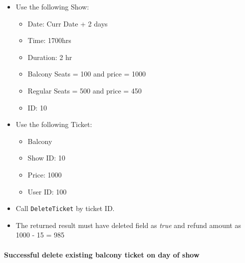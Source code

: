 \documentclass[]{article}
\providecommand{\tightlist}{%
  \setlength{\itemsep}{0pt}\setlength{\parskip}{0pt}}
\let\oldparagraph\paragraph
\renewcommand{\paragraph}[1]{\oldparagraph{#1}\mbox{}}
\begin{document}
\begin{itemize}
\tightlist
\item
  Use the following Show:

  \begin{itemize}
  \tightlist
  \item
    Date: Curr Date + 2 days
  \item
    Time: 1700hrs
  \item
    Duration: 2 hr
  \item
    Balcony Seats = 100 and price = 1000
  \item
    Regular Seats = 500 and price = 450
  \item
    ID: 10
  \end{itemize}
\item
  Use the following Ticket:

  \begin{itemize}
  \tightlist
  \item
    Balcony
  \item
    Show ID: 10
  \item
    Price: 1000
  \item
    User ID: 100
  \end{itemize}
\item
  Call \texttt{DeleteTicket} by ticket ID.
\item
  The returned result must have deleted field as \emph{true} and refund
  amount as 1000 - 15 = 985
\end{itemize}

\hypertarget{successful-delete-existing-balcony-ticket-on-day-of-show}{%
\paragraph{Successful delete existing balcony ticket on day of
show}\label{successful-delete-existing-balcony-ticket-on-day-of-show}}
\end{document}
